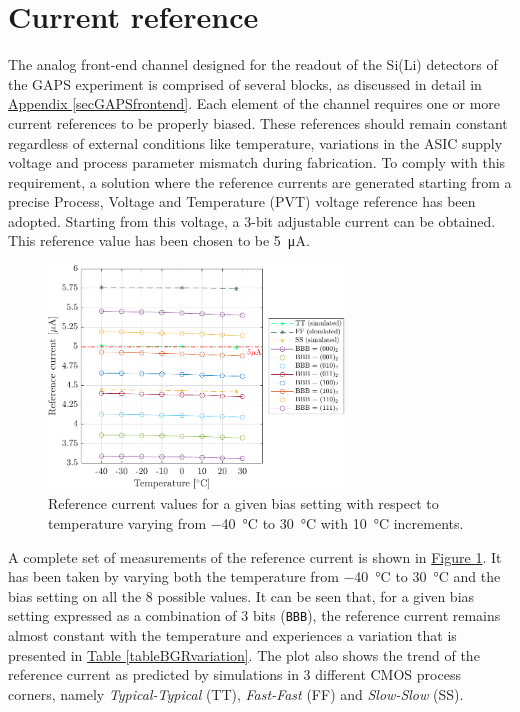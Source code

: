 
\section{Current reference}

The analog front-end channel designed for the readout of the Si(Li) detectors of the GAPS experiment is comprised of several blocks, as discussed in detail in \hyperref[secGAPSfrontend]{Appendix \ref{secGAPSfrontend}}. Each element of the channel requires one or more current references to be properly biased. These references should remain  constant regardless of external conditions like temperature, variations in the ASIC supply voltage and process parameter mismatch during fabrication. To comply with this requirement, a solution where the reference currents are generated starting from a precise Process, Voltage and Temperature (PVT) voltage reference has been adopted. Starting from this voltage, a 3-bit adjustable current can be obtained. This reference value has been chosen to be \SI{5}{\micro\ampere}.

\begin{figure}[h!]
    \centering
    \includegraphics[width=0.7\textwidth]{Images/chap1/results/BGR_current/BGR_current_Xtemp_all-BBB.pdf}
    \caption{Reference current values for a given bias setting with respect to temperature varying from \SI{-40}{\celsius} to \SI{30}{\celsius} with \SI{10}{\celsius} increments.}
    \label{figBGRplotsXtempall}
\end{figure}

\par
A complete set of measurements of the reference current is shown in \hyperref[figBGRplotsXtempall]{Figure \ref{figBGRplotsXtempall}}. It has been taken by varying both the temperature from \SI{-40}{\celsius} to \SI{30}{\celsius} and the bias setting on all the 8 possible values. It can be seen that, for a given bias setting expressed as a combination of 3 bits (\texttt{BBB}), the reference current remains almost constant with the temperature and experiences a variation that is presented in \hyperref[tableBGRvariation]{Table \ref{tableBGRvariation}}. The plot also shows the trend of the reference current as predicted by simulations in 3 different CMOS process corners, namely \textit{Typical-Typical} (TT), \textit{Fast-Fast} (FF) and \textit{Slow-Slow} (SS).

